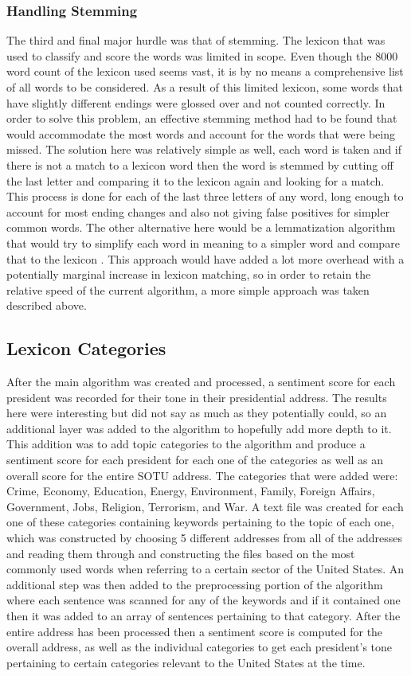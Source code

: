 \documentclass[acmtog, review, screen]{acmart}
\begin{document}
\subsubsection{Handling Stemming}
The third and final major hurdle was that of stemming.
The lexicon that was used to classify and score the words was limited in scope.
Even though the 8000 word count of the lexicon used seems vast, it is by no means a comprehensive list of all words to be considered.
As a result of this limited lexicon, some words that have slightly different endings were glossed over and not counted correctly.
In order to solve this problem, an effective stemming method had to be found that would accommodate the most words and account for the words that were being missed.
The solution here was relatively simple as well, each word is taken and if there is not a match to a lexicon word then the word is stemmed by cutting off the last letter and comparing it to the lexicon again and looking for a match.
This process is done for each of the last three letters of any word, long enough to account for most ending changes and also not giving false positives for simpler common words.
The other alternative here would be a lemmatization algorithm that would try to simplify each word in meaning to a simpler word and compare that to the lexicon \cite{stem}.
This approach would have added a lot more overhead with a potentially marginal increase in lexicon matching, so in order to retain the relative speed of the current algorithm, a more simple approach was taken described above.

\subsection{Lexicon Categories}
After the main algorithm was created and processed, a sentiment score for each president was recorded for their tone in their presidential address.
The results here were interesting but did not say as much as they potentially could, so an additional layer was added to the algorithm to hopefully add more depth to it.
This addition was to add topic categories to the algorithm and produce a sentiment score for each president for each one of the categories as well as an overall score for the entire SOTU address.
The categories that were added were: Crime, Economy, Education, Energy, Environment, Family, Foreign Affairs, Government, Jobs, Religion, Terrorism, and War.
A text file was created for each one of these categories containing keywords pertaining to the topic of each one, which was constructed by choosing 5 different addresses from all of the addresses and reading them through and constructing the files based on the most commonly used words when referring to a certain sector of the United States.
An additional step was then added to the preprocessing portion of the algorithm where each sentence was scanned for any of the keywords and if it contained one then it was added to an array of sentences pertaining to that category.
After the entire address has been processed then a sentiment score is computed for the overall address, as well as the individual categories to get each president's tone pertaining to certain categories relevant to the United States at the time.
\end{document}
